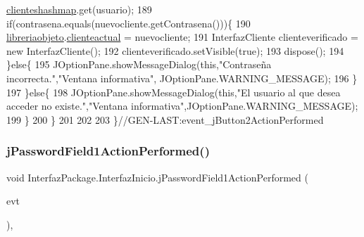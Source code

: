 \begin{DoxyCode}
      \mbox{\hyperlink{classlibreria_1_1_libreria_a9bb86627af6c43f97367c8a28d9f0d3e}{clienteshashmap}}.get(usuario);
189                 \textcolor{keywordflow}{if}(contrasena.equals(nuevocliente.getContrasena()))\{
190                     \mbox{\hyperlink{class_interfaz_package_1_1_interfaz_inicio_adccd9cfdf4551ca7ae66b2c9caffa049}{libreriaobjeto}}.\mbox{\hyperlink{classlibreria_1_1_libreria_afcc53a4ee673ee845bc07288aa5c7181}{clienteactual}} = nuevocliente;
191                     InterfazCliente clienteverificado = \textcolor{keyword}{new} InterfazCliente();
192                     clienteverificado.setVisible(\textcolor{keyword}{true});
193                     dispose();
194                 \}\textcolor{keywordflow}{else}\{
195                     JOptionPane.showMessageDialog(\textcolor{keyword}{this},\textcolor{stringliteral}{"Contraseña incorrecta."},\textcolor{stringliteral}{"Ventana informativa"},
      JOptionPane.WARNING\_MESSAGE);
196                 \}
197             \}\textcolor{keywordflow}{else}\{
198                 JOptionPane.showMessageDialog(\textcolor{keyword}{this},\textcolor{stringliteral}{"El usuario al que desea acceder no existe."},\textcolor{stringliteral}{"Ventana
       informativa"},JOptionPane.WARNING\_MESSAGE);
199             \}
200         \}
201         
202         
203     \}\textcolor{comment}{//GEN-LAST:event\_jButton2ActionPerformed}
\end{DoxyCode}
\mbox{\label{class_interfaz_package_1_1_interfaz_inicio_a10646879dd0bce67c6df4ba1f8ddaf64}} 
\subsubsection{\texorpdfstring{j\+Password\+Field1\+Action\+Performed()}{jPasswordField1ActionPerformed()}}
{\footnotesize\ttfamily void Interfaz\+Package.\+Interfaz\+Inicio.\+j\+Password\+Field1\+Action\+Performed (\begin{DoxyParamCaption}\item[{java.\+awt.\+event.\+Action\+Event}]{evt }\end{DoxyParamCaption})\hspace{0.3cm}{\ttfamily [inline]}, {\ttfamily [private]}}


